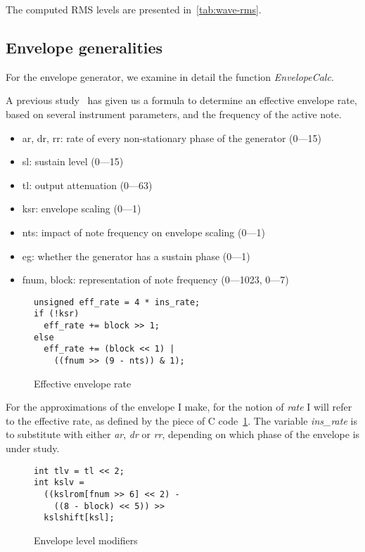 \documentclass[twoside,twocolumn]{article}
\begin{document}
The computed RMS levels are presented in~\ref{tab:wave-rms}.

\subsection{Envelope generalities}\label{sec:env-generalities}

For the envelope generator, we examine in detail the function \emph{EnvelopeCalc}.

A previous study~\cite{opl3analyzed} has given us a formula to determine an effective
envelope rate, based on several instrument parameters, and the frequency of the active note.

\begin{itemize}
  \item{ar, dr, rr:} rate of every non-stationary phase of the generator (0—15)
  \item{sl:} sustain level (0—15)
  \item{tl:} output attenuation (0—63)
  \item{ksr:} envelope scaling (0—1)
  \item{nts:} impact of note frequency on envelope scaling (0—1)
  \item{eg:} whether the generator has a sustain phase (0—1)
  \item{fnum, block:} representation of note frequency (0—1023, 0—7)
\end{itemize}

\begin{figure}
\begin{lstlisting}
unsigned eff_rate = 4 * ins_rate;
if (!ksr)
  eff_rate += block >> 1;
else
  eff_rate += (block << 1) |
    ((fnum >> (9 - nts)) & 1);
\end{lstlisting}
\caption{Effective envelope rate}\label{code:eff-rate}
\end{figure}

For the approximations of the envelope I make, for the notion of \emph{rate} I will
refer to the effective rate, as defined by the piece of C code~\ref{code:eff-rate}. The variable
\emph{ins\_rate} is to substitute with either \emph{ar}, \emph{dr} or \emph{rr},
depending on which phase of the envelope is under study.

\begin{figure}
\begin{lstlisting}
int tlv = tl << 2;
int kslv =
  ((kslrom[fnum >> 6] << 2) -
    ((8 - block) << 5)) >>
  kslshift[ksl];
\end{lstlisting}
\caption{Envelope level modifiers}\label{code:level-modifiers}
\end{figure}
\end{document}
